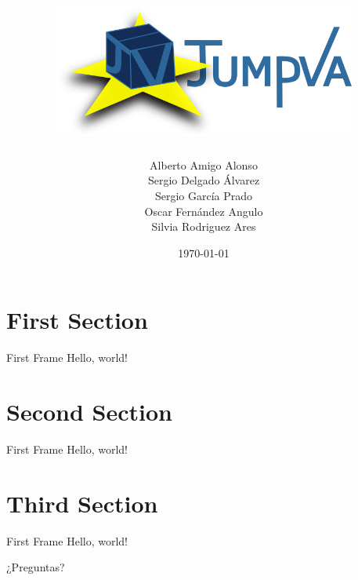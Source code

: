\documentclass{beamer}
\title{
    \centering
    {\includegraphics[width=0.75\textwidth]{res/logo}}
}
\date{
    \today
}
\author{
    Alberto Amigo Alonso \\
    Sergio Delgado Álvarez \\
    Sergio García Prado \\
    Oscar Fernández Angulo \\
    Silvia Rodriguez Ares \\
}
\institute{Universidad de Valladolid}
\begin{document}
    \maketitle

    \section{First Section}

        \begin{frame}{First Frame}
            Hello, world!
        \end{frame}

    \section{Second Section}

        \begin{frame}{First Frame}
            Hello, world!
        \end{frame}

    \section{Third Section}

        \begin{frame}{First Frame}
            Hello, world!
        \end{frame}

    \begin{frame}[standout]
        ¿Preguntas?
    \end{frame}
\end{document}
